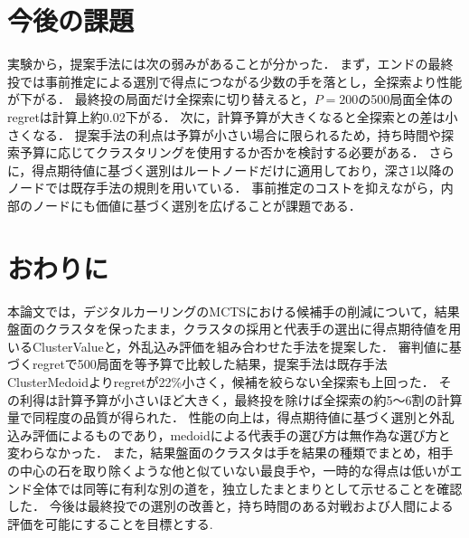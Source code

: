 \documentclass[submit]{ipsj}
\begin{document}
\section{今後の課題}
\label{sec:future}

実験から，提案手法には次の弱みがあることが分かった．
まず，エンドの最終投では事前推定による選別で得点につながる少数の手を落とし，全探索より性能が下がる．
最終投の局面だけ全探索に切り替えると，$P=200$の500局面全体のregretは計算上約0.02下がる．
次に，計算予算が大きくなると全探索との差は小さくなる．
提案手法の利点は予算が小さい場合に限られるため，持ち時間や探索予算に応じてクラスタリングを使用するか否かを検討する必要がある．
さらに，得点期待値に基づく選別はルートノードだけに適用しており，深さ1以降のノードでは既存手法の規則を用いている．
事前推定のコストを抑えながら，内部のノードにも価値に基づく選別を広げることが課題である．

\section{おわりに}
\label{sec:conclusion}

本論文では，デジタルカーリングのMCTSにおける候補手の削減について，結果盤面のクラスタを保ったまま，クラスタの採用と代表手の選出に得点期待値を用いるClusterValueと，外乱込み評価を組み合わせた手法を提案した．
審判値に基づくregretで500局面を等予算で比較した結果，提案手法は既存手法ClusterMedoidよりregretが22\%小さく，候補を絞らない全探索も上回った．
その利得は計算予算が小さいほど大きく，最終投を除けば全探索の約5〜6割の計算量で同程度の品質が得られた．
性能の向上は，得点期待値に基づく選別と外乱込み評価によるものであり，medoidによる代表手の選び方は無作為な選び方と変わらなかった．
また，結果盤面のクラスタは手を結果の種類でまとめ，相手の中心の石を取り除くような他と似ていない最良手や，一時的な得点は低いがエンド全体では同等に有利な別の道を，独立したまとまりとして示せることを確認した．
今後は最終投での選別の改善と，持ち時間のある対戦および人間による評価を可能にすることを目標とする.





\end{document}
